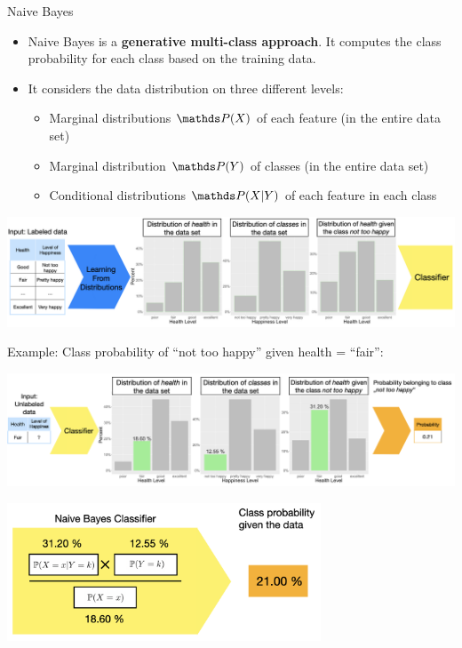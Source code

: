 \documentclass[11pt,compress,t,notes=noshow, xcolor=table]{beamer}
\begin{document}
\begin{vbframe}{Naive Bayes}
\begin{itemize}
\item \small Naive Bayes is a \textbf{generative multi-class approach}. It computes the class probability for each class based on the training data.
\item \small It considers the data distribution on three different levels:
    \begin{itemize}
    \item \small Marginal distributions $\P(X)$ of each feature (in the entire data set)
    \item \small Marginal distribution $\P(Y)$ of classes (in the entire data set)
    \item \small Conditional distributions $\P(X|Y)$ of each feature in each class
    \end{itemize}
\vspace*{1cm}
\end{itemize}
\begin{center}
  \includegraphics[width=1\textwidth]{figure_man/nutshell-classif-distributions_learning.png}
\end{center}

\newpage
\item \small Example: Class probability of ``not too happy'' given health = ``fair'':
\begin{center}
  \includegraphics[width=1\textwidth]{figure_man/nutshell-classif-distributions-prediction.png}
\end{center}
\begin{center}
  \includegraphics[width=0.7\textwidth]{figure_man/nutshell-classif-naive-bayes-formula.png}
\end{center}

\end{vbframe}

\endlecture
\end{document}
